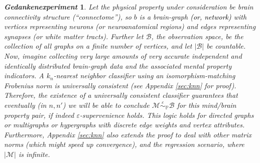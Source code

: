 \documentclass{article}
\newcommand{\mB}{\mathcal{B}}
\newcommand{\mM}{\mathcal{M}}
\newcommand{\PP}{\mathbb{P}}           %
\newcommand{\MeB}{\mM \overset{\varepsilon}{{\sim}}_{\PP} \mB}
\providecommand{\tr}[1]{\textcolor{black}{#1}}
\newtheorem{thex}{\emph{Gedankenexperiment}}
\begin{document}
\begin{thex}
Let the physical property under consideration be brain connectivity structure (``connectome''), so $b$ is a brain-graph \tr{(or, network)} with vertices representing neurons (or neuroanatomical regions) and edges representing synapses (or white matter tracts). Further let $\mB$, the observation space, be the collection of all graphs on a finite number of vertices, and let $|\mB|$ be countable. Now, imagine collecting very large amounts of very accurate independent and identically distributed brain-graph data and the associated mental property indicators. A $k_n$-nearest neighbor classifier using an isomorphism-matching Frobenius norm is universally consistent (see Appendix \ref{sec:knn} for proof). Therefore, %
the existence of a universally consistent classifier guarantees that eventually (in $n,n'$) we will be able to conclude $\MeB$ for this mind/brain property pair, if indeed $\varepsilon$-supervenience holds. This logic holds for directed graphs or multigraphs or hypergraphs with discrete edge weights and vertex attributes. Furthermore, Appendix \ref{sec:knn} also extends the proof to deal with other matrix norms (which might speed up convergence), and the regression scenario, where $|\mM|$ is infinite.  
\end{thex}
\end{document}
